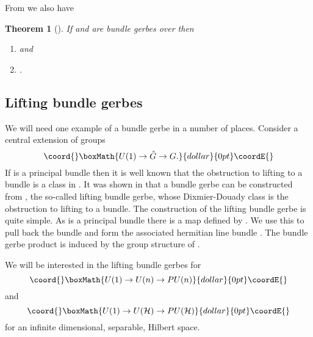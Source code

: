 \documentclass[a4paper,reqno]{amsart}
\theoremstyle{plain}
\newtheorem{theorem}{Theorem}[section]
\theoremstyle{definition}
\theoremstyle{remark}
\numberwithin{equation}{section}
\numberwithin{figure}{section}
\providecommand{\cH}{{\mathcal H}}
\providecommand{\ZZ}{{\mathbb Z}}
\providecommand{\<}{\langle}
\renewcommand{\>}{\rangle}
\begin{document}
          From \cite{Mur} we also have
\begin{theorem}[\cite{Mur}]
\label{th:dd}
If \coordHE{} and \coordHE{} are bundle gerbes over \coordHE{} then
\begin{enumerate}
\item {}\coordHE{} and
\item{}\coordHE{}.
\end{enumerate}
\end{theorem}

\subsection{Lifting bundle gerbes}
\label{sec:lbg}
We will need one example of a bundle gerbe in a number of places.
Consider a central
extension of groups
$$\coord{}\boxMath{
U(1) \to \hat G \to G.
}{dollar}{0pt}\coordE{}$$
If \coordHE{} is a principal \coordHE{} bundle then it is well known that the
obstruction to lifting \coordHE{} to a \coordHE{} bundle is a class in \myHighlight{$H^3(M, \ZZ)$}\coordHE{}.
It was shown in \cite{Mur} that a bundle gerbe can be constructed
from \coordHE{}, the so-called lifting bundle gerbe, whose Dixmier-Douady
class is the obstruction to lifting \coordHE{} to a \coordHE{} bundle. The construction
of the lifting bundle gerbe is quite simple. As \coordHE{} is a principal bundle
there is a map \coordHE{} defined by \coordHE{}.
We use this
to pull back the \coordHE{} bundle \coordHE{} and form the associated hermitian
line bundle \coordHE{}. The bundle gerbe product is induced by the group
structure of \coordHE{}.

We will be interested in the lifting bundle gerbes for
$$\coord{}\boxMath{
U(1) \to U(n) \to PU(n)
}{dollar}{0pt}\coordE{}$$
and
$$\coord{}\boxMath{
U(1) \to U(\cH)\to PU(\cH)
}{dollar}{0pt}\coordE{}$$
for \myHighlight{$\cH$}\coordHE{} an infinite dimensional, separable, Hilbert space.
\end{document}
